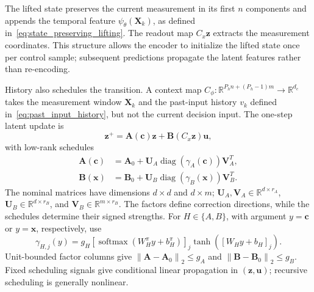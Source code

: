 \documentclass[journal]{IEEEtran}
\newcommand{\vx}{\mathbf{x}}
\newcommand{\vu}{\mathbf{u}}
\newcommand{\vz}{\mathbf{z}}
\newcommand{\vc}{\mathbf{c}}
\newcommand{\mA}{\mathbf{A}}
\newcommand{\mB}{\mathbf{B}}
\newcommand{\mU}{\mathbf{U}}
\newcommand{\mV}{\mathbf{V}}
\newcommand{\mX}{\mathbf{X}}
\newcommand{\R}{\mathbb{R}}
\newcommand{\norm}[1]{\left\lVert #1\right\rVert}
\begin{document}
The lifted state preserves the current measurement in its first $n$ components and appends the temporal feature $\psi_\theta(\mX_k)$, as defined in~\eqref{eq:state_preserving_lifting}. The readout map $C_x\vz$ extracts the measurement coordinates. This structure allows the encoder to initialize the lifted state once per control sample; subsequent predictions propagate the latent features rather than re-encoding.

History also schedules the transition. A context map $C_\phi:\R^{P_hn+(P_h-1)m}\to\R^{d_c}$ takes the measurement window $\mX_k$ and the past-input history $v_k$ defined in~\eqref{eq:past_input_history}, but not the current decision input. The one-step latent update is
\begin{equation}
\vz^+=\mA(\vc)\vz+\mB(C_x\vz)\vu,
\label{eq:scheduled_predictor}
\end{equation}
with low-rank schedules
\begin{align}
\mA(\vc)&=\mA_0+\mU_A\operatorname{diag}(\gamma_A(\vc))\mV_A^T,
\label{eq:transition_schedule}\\
\mB(\vx)&=\mB_0+\mU_B\operatorname{diag}(\gamma_B(\vx))\mV_B^T.
\label{eq:low_rank_schedules}
\end{align}
The nominal matrices have dimensions $d\times d$ and $d\times m$; $\mU_A,\mV_A\in\R^{d\times r_A}$, $\mU_B\in\R^{d\times r_B}$, and $\mV_B\in\R^{m\times r_B}$. The factors define correction directions, while the schedules determine their signed strengths. For $H\in\{A,B\}$, with argument $y=\vc$ or $y=\vx$, respectively, use
\begin{equation}
\gamma_{H,j}(y)=g_H[\operatorname{softmax}(W_H^\pi y+b_H^\pi)]_j
\tanh([W_Hy+b_H]_j).
\label{eq:A_modulation_coefficients}
\end{equation}
Unit-bounded factor columns give $\norm{\mA-\mA_0}_2\le g_A$ and $\norm{\mB-\mB_0}_2\le g_B$. Fixed scheduling signals give conditional linear propagation in $(\vz,\vu)$; recursive scheduling is generally nonlinear.
\end{document}
